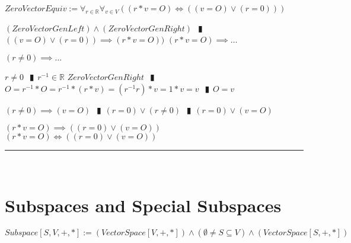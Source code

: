\documentclass{book}
\newcommand{\abr}{:=}
\newcommand{\pipe}{$\phantom{(}\vrectangleblack\phantom{)}$}
\newcommand{\pr}[1]{\left(#1\right)}
\begin{document}
$ZeroVectorEquiv \abr \forall_{r \in \mathbb{R}} \forall_{v \in V}\pr{(r * v = O) \iff \pr{(v = O) \lor (r = 0)}}$
\begin{enumerate}
  \lit $(ZeroVectorGenLeft) \land (ZeroVectorGenRight)$ \pipe $\pr{(v = O) \lor (r = 0)} \implies (r * v = O))$
  \lit $(r * v = O) \implies \ldots$
  \begin{enumerate}
    \lit $(r \neq 0) \implies \ldots$
      \begin{enumerate}
        \lit $r \neq 0$ \pipe $r^{-1} \in \mathbb{R}$
        \lit $ZeroVectorGenRight$ \pipe $O = r^{-1} * O = r^{-1} * (r * v) = (r^{-1} r) * v = 1 * v = v$ \pipe $O = v$
      \end{enumerate}
      \lit $(r \neq 0) \implies (v = O)$ \pipe $(r = 0) \lor (r \neq 0)$ \pipe $(r = 0) \lor (v = O)$
  \end{enumerate}
  \lit $(r * v = O) \implies \pr{(r = 0) \lor (v = O)}$
  \lit $(r * v = O) \iff \pr{(r = 0) \lor (v = O)}$
\end{enumerate} \vspace{.75mm} \hrule \vspace{.75mm} \ \\ 

\section{Subspaces and Special Subspaces}
$Subspace[S, V, +, *] \abr (VectorSpace[V, +, *]) \land (\emptyset \neq S \subseteq V) \land (VectorSpace[S, +, *])$ \\
\end{document}
